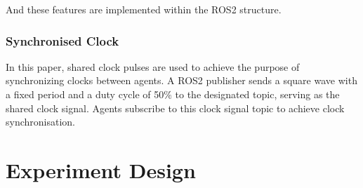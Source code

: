 And these features are implemented within the ROS2 structure.

\subsubsection*{Synchronised Clock}

In this paper, shared clock pulses are used to achieve the purpose of synchronizing clocks between agents.
A ROS2 publisher sends a square wave with a fixed period and a duty cycle of 50$\%$ to the designated topic, serving as the shared clock signal. 
Agents subscribe to this clock signal topic to achieve clock synchronisation.





\section{Experiment Design}


